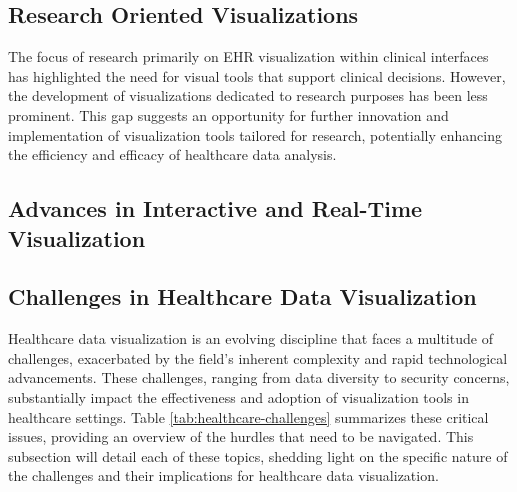 \subsection{Research Oriented Visualizations}\label{research-oriented-visualizations}

The focus of research primarily on EHR visualization within clinical interfaces has highlighted the need for visual tools that support clinical decisions. However, the development of visualizations dedicated to research purposes has been less prominent. This gap suggests an opportunity for further innovation and implementation of visualization tools tailored for research, potentially enhancing the efficiency and efficacy of healthcare data analysis.

\subsection{Advances in Interactive and Real-Time Visualization}\label{advances-in-interactive-and-real-time-visualization}

\subsection{Challenges in Healthcare Data Visualization}\label{challenges-in-healthcare-data-visualization}

Healthcare data visualization is an evolving discipline that faces a multitude of challenges, exacerbated by the field's inherent complexity and rapid technological advancements. These challenges, ranging from data diversity to security concerns, substantially impact the effectiveness and adoption of visualization tools in healthcare settings. Table \ref{tab:healthcare-challenges} summarizes these critical issues, providing an overview of the hurdles that need to be navigated. This subsection will detail each of these topics, shedding light on the specific nature of the challenges and their implications for healthcare data visualization.

